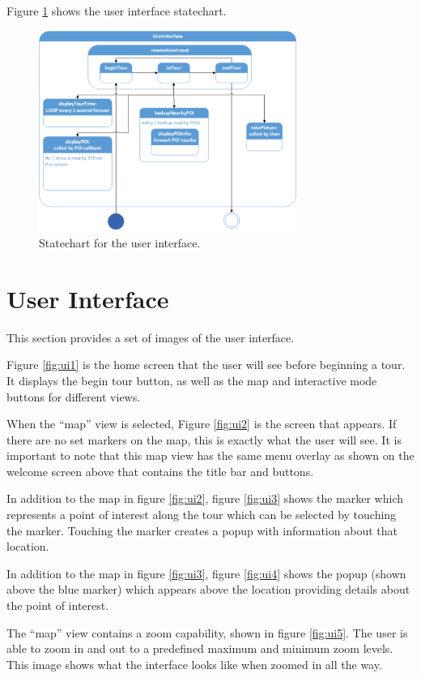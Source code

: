 \documentclass[11pt]{report}
\begin{document}
Figure \ref{fig:user_interface_statechart} shows the user interface statechart.
\begin{figure}[H]
 \centering
 \includegraphics[width=0.75\textwidth]{user_interface_statechart.pdf}
 \caption{Statechart for the user interface.}
 \label{fig:user_interface_statechart}
\end{figure}

\section{User Interface}
This section provides a set of images of the user interface.

Figure \ref{fig:ui1} is the home screen that the user will see before beginning a tour. It displays the begin tour button, as well as the map and interactive mode buttons for different views.

When the “map” view is selected, Figure \ref{fig:ui2} is the screen that appears. If there are no set markers on the map, this is exactly what the user will see. It is important to note that 
this map view has the same menu overlay as shown on the welcome screen above that contains the title bar and buttons.

In addition to the map in figure \ref{fig:ui2}, figure \ref{fig:ui3} shows the marker which represents a point of interest along the tour which can be selected by touching the marker. Touching the marker creates a popup with information about that location.

In addition to the map in figure \ref{fig:ui3}, figure \ref{fig:ui4} shows the popup (shown above the blue marker) which appears above the location providing details about the point of interest.

The “map” view contains a zoom capability, shown in figure \ref{fig:ui5}. The user is able to zoom in and out to a predefined maximum and minimum zoom levels. This image shows what the interface looks like when zoomed in all the way.
\end{document}
